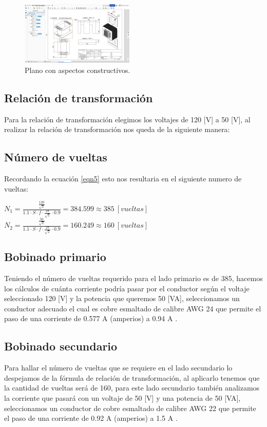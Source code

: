 \begin{figure}[ht!]
    \centering
    \includegraphics[width=0.48\textwidth]{fot/T1.png}
    \caption{Plano con aspectos constructivos.}
    \label{fig:T1}
\end{figure}



\subsection{Relación de transformación}
Para la relación de transformación elegimos los voltajes de 120 [V] a 50 [V], al realizar la relación de transformación nos queda de la siguiente manera: 

\subsection{Número de vueltas}
Recordando la ecuación \ref{eqn5}
esto nos resultaria en el siguiente numero de vueltas:

\begin{center}
    $N_1 = \frac{\frac{120}{\sqrt{2}}}{1.1\cdot S\cdot f \cdot \frac{2\pi}{\sqrt{2}}\cdot 0.9}=384.599 \approx 385\ [vueltas]$
    $N_2 = \frac{\frac{50}{\sqrt{2}}}{1.1\cdot S\cdot f \cdot \frac{2\pi}{\sqrt{2}}\cdot 0.9}=160.249 \approx 160\ [vueltas]$
    \end{center}
    
\subsection{Bobinado primario}
Teniendo el número de vueltas requerido para el lado primario es de 385, hacemos los cálculos de cuánta corriente podría pasar por el conductor según el voltaje seleccionado 120 [V] y la potencia que queremos 50 [VA], seleccionamos un conductor adecuado el cual es cobre esmaltado de calibre AWG 24 que permite el paso de una corriente de 0.577 A (amperios) a 0.94 A .

\subsection{Bobinado secundario}
Para hallar el número de vueltas que se requiere en el lado secundario lo despejamos de la fórmula de relación de transformación, al aplicarlo tenemos que la cantidad de vueltas será de 160, para este lado secundario también analizamos la corriente que pasará con un voltaje de 50 [V] y una potencia de 50 [VA], seleccionamos un conductor de cobre esmaltado de calibre AWG 22 que permite el paso de una corriente de 0.92 A (amperios) a 1.5 A .

